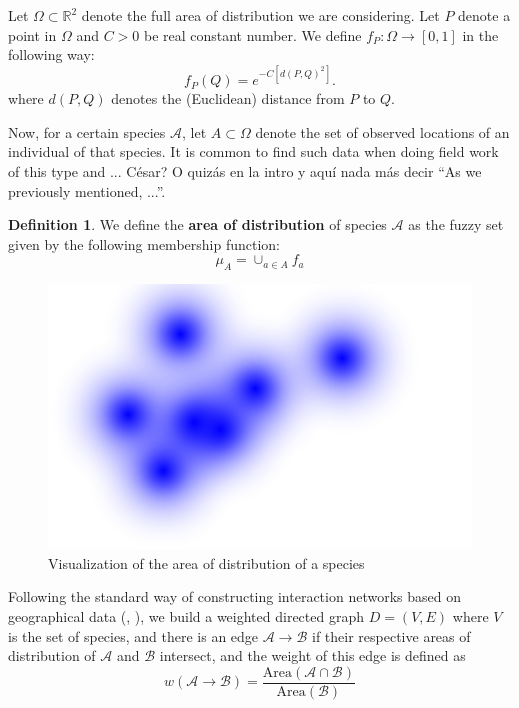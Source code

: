 \documentclass[12pt]{article}
\numberwithin{equation}{section} %
\numberwithin{figure}{section} %
\def\area{{\text{Area}}} %
\def\cA{{\mathcal{A}}}
\def\cB{{\mathcal{B}}}
\def\RR{{\mathbb{R}}}
\theoremstyle{definition}
\newtheorem{definition}[theorem]{Definition}
\def\tcr#1{\textcolor{MyRed}{#1}}
\begin{document}
Let $\Omega \subset \RR^2$ denote the full area of distribution we are considering. Let $P$ denote a point in $\Omega$ and $C > 0$ be real constant number. We define $f_P:\Omega \to [0,1]$ in the following way:
	$$f_P(Q) = e^{-C\left[d(P,Q)^2\right]}.$$
	where $d(P,Q)$ denotes the (Euclidean) distance from $P$ to $Q$.

	Now, for a certain species $\cA$, let $A \subset \Omega$ denote the set of observed locations of an individual of that species. It is common to find such data when doing field work of this type and ... \tcr{César? O quizás en la intro y aquí nada más decir ``As we previously mentioned, ...''}.

  \begin{definition}
	We define the \textbf{area of distribution} of species $\cA$ as the fuzzy set given by the following membership function:
		$$\mu_A = \cup_{a\in A} f_a$$
  \end{definition}
  
	\begin{figure}
	\begin{center}
		\includegraphics[scale=0.35]{./distribucion.png}
		\caption{Visualization of the area of distribution of a species}
	\end{center}
	
	\end{figure}
	
	Following the standard way of constructing interaction networks based on geographical data (\cite{cesarthesis}, \cite{cesarpaper1}), we build a weighted directed graph $D=(V,E)$ where $V$ is the set of species, and there is an edge $\cA \to \cB$ if their respective areas of distribution of $\cA$ and $\cB$ intersect, and the weight of this edge is defined as
	$$w(\cA \to \cB) = \frac{\area(\cA\cap\cB)}{\area(\cB)}$$
\end{document}
